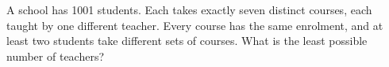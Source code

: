 A school has 1001 students. Each takes exactly seven distinct courses, each taught by one different teacher. Every course has the same enrolment, and at least two students take different sets of courses. What is the least possible number of teachers?
